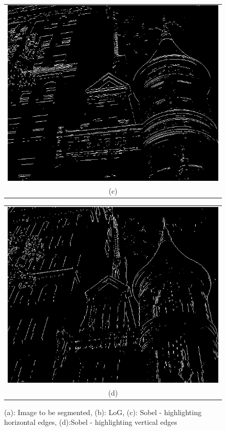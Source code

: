 \begin{figure}[h!]
\\
\begin{minipage}{.45\textwidth}
\begin{tabular}{c}
\includegraphics[width=.9\textwidth]{segmentation/sobelHorizontal} \\
(c)
\end{tabular}
\end{minipage}
\begin{minipage}{.45\textwidth}
\begin{tabular}{c}
\includegraphics[width=.9\textwidth]{segmentation/sobelVertical} \\
(d)
\end{tabular}
\end{minipage}
\caption{(a): Image to be segmented, (b): LoG, (c): Sobel - highlighting horizontal edges, (d):Sobel - highlighting vertical edges}
\label{edgeSeg}
\end{figure}

